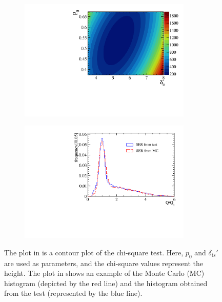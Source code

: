 \begin{figure}[h]
	\centering
	\begin{subfigure}{0.5\textwidth}
		\centering
		\includegraphics[width=0.9\textwidth]{PMTRelated/GTmodel/cour.pdf}
		\caption{}
		\label{fig:cour}
	\end{subfigure}%
	\hfill
	\begin{subfigure}{0.5\textwidth}
		\centering
		\includegraphics[width=0.9\textwidth]{PMTRelated/GTmodel/hist.pdf}
		\caption{}
		\label{fig:hist}
	\end{subfigure}
	\caption{The plot in  is a contour plot of the chi-square test. Here, $p_0$ and $\delta_{\mathrm{ts}}'$ are used as parameters, and the chi-square values represent the height. The plot in  shows an example of the Monte Carlo (MC) histogram (depicted by the red line) and the histogram obtained from the test (represented by the blue line).
	}
	\label{fig:chi}
\end{figure}

